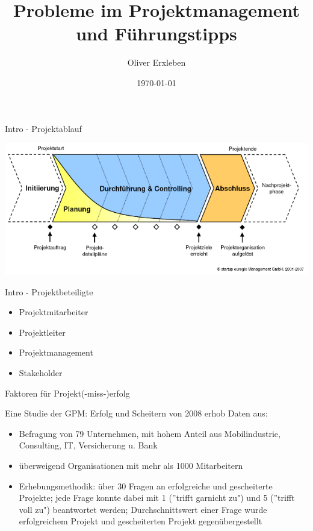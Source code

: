 \documentclass[12pt]{beamer}
\title{Probleme im Projektmanagement und Führungstipps}
\author{Oliver Erxleben}
\institute{Hochschule Osnabrück}
\date{\today}
\begin{document}
	\thispagestyle{empty}
	\frame{\titlepage}
		
	\begin{frame}{Intro - Projektablauf}
		\begin{center}
			\includegraphics[width=1.0\textwidth]{images/pm-prozess}
		\end{center}

	\end{frame}

	\begin{frame}{Intro - Projektbeteiligte}
	
		\begin{itemize}
			\item{Projektmitarbeiter}
			\item{Projektleiter}
			\item{Projektmanagement}
			\item{Stakeholder}
		\end{itemize}

	\end{frame}
	
	\thispagestyle{empty}
	
	\begin{frame}{Faktoren für Projekt(-miss-)erfolg}
		
		Eine Studie der GPM: Erfolg und Scheitern von 2008 erhob Daten aus: 
		\begin{itemize}
			\item{Befragung von 79 Unternehmen, mit hohem Anteil aus Mobilindustrie, Consulting, IT, Versicherung u. Bank }
			\item{überweigend Organisationen mit mehr als 1000 Mitarbeitern}
			\item{Erhebungsmethodik: über 30 Fragen an erfolgreiche und gescheiterte Projekte; jede Frage konnte dabei mit 1 (''trifft garnicht zu") und 5 (''trifft voll zu") beantwortet werden; Durchschnittswert einer Frage wurde erfolgreichem Projekt und gescheiterten Projekt gegenübergestellt}
		\end{itemize}

	\end{frame}
\end{document}
